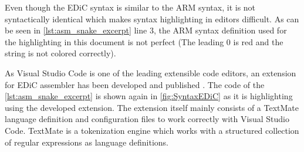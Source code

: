 Even though the \gls{EDiC} syntax is similar to the ARM syntax, it is not syntactically identical which makes syntax highlighting in editors difficult.
As can be seen in \cref{lst:asm_snake_excerpt} line 3, the ARM syntax definition used for the highlighting in this document is not perfect (The leading 0 is red and the string is not colored correctly).

As Visual Studio Code \cite{VSCode} is one of the leading extensible code editors, an extension for \gls{EDiC} assembler has been developed and published \cite{VSCodeEDiC}.
The code of the \cref{lst:asm_snake_excerpt} is shown again in \cref{fig:SyntaxEDiC} as it is highlighting using the developed extension.
The extension itself mainly consists of a TextMate language definition \cite{TextMate} and configuration files to work correctly with Visual Studio Code.
TextMate is a tokenization engine which works with a structured collection of regular expressions as language definitions.